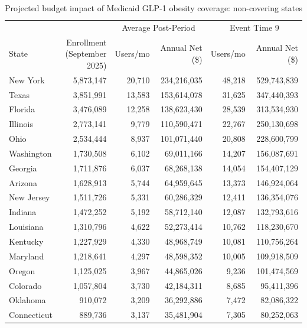 \begin{landscape}
\pagestyle{lscaped}
\begin{table}[!htbp]
\centering
\caption{Projected budget impact of Medicaid GLP-1 obesity coverage: non-covering states}
\label{tab:budget_impact_noncovering}
\footnotesize
\renewcommand{\arraystretch}{0.92}
\setlength{\tabcolsep}{10pt}
\begin{tabular}{@{} l r rr rr @{}}
\toprule
 & & \multicolumn{2}{c}{Average Post-Period} & \multicolumn{2}{c}{Event Time 9} \\
\cmidrule(lr){3-4} \cmidrule(lr){5-6}
State & \shortstack{Enrollment\\(September 2025)} & Users/mo & Annual Net (\$) & Users/mo & Annual Net (\$) \\
\midrule
  New York & 5,873,147 & 20,710 & 234,216,035 & 48,218 & 529,743,839 \\
  Texas & 3,851,991 & 13,583 & 153,614,078 & 31,625 & 347,440,393 \\
  Florida & 3,476,089 & 12,258 & 138,623,430 & 28,539 & 313,534,930 \\
  Illinois & 2,773,141 & 9,779 & 110,590,471 & 22,767 & 250,130,698 \\
  Ohio & 2,534,444 & 8,937 & 101,071,440 & 20,808 & 228,600,799 \\
  Washington & 1,730,508 & 6,102 & 69,011,166 & 14,207 & 156,087,691 \\
  Georgia & 1,711,876 & 6,037 & 68,268,138 & 14,054 & 154,407,129 \\
  Arizona & 1,628,913 & 5,744 & 64,959,645 & 13,373 & 146,924,064 \\
  New Jersey & 1,511,726 & 5,331 & 60,286,329 & 12,411 & 136,354,076 \\
  Indiana & 1,472,252 & 5,192 & 58,712,140 & 12,087 & 132,793,616 \\
  Louisiana & 1,310,796 & 4,622 & 52,273,414 & 10,762 & 118,230,670 \\
  Kentucky & 1,227,929 & 4,330 & 48,968,749 & 10,081 & 110,756,264 \\
  Maryland & 1,218,641 & 4,297 & 48,598,352 & 10,005 & 109,918,509 \\
  Oregon & 1,125,025 & 3,967 & 44,865,026 & 9,236 & 101,474,569 \\
  Colorado & 1,057,804 & 3,730 & 42,184,311 & 8,685 & 95,411,396 \\
  Oklahoma & 910,072 & 3,209 & 36,292,886 & 7,472 & 82,086,322 \\
  Connecticut & 889,736 & 3,137 & 35,481,904 & 7,305 & 80,252,063 \\

\end{tabular}
\end{table}
\end{landscape}
